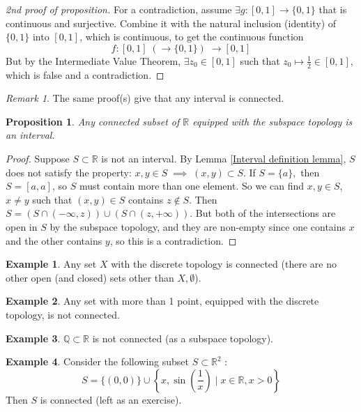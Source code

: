 \documentclass{article}
\theoremstyle{definition}
\newtheorem{exmp}{Example}[section]
\theoremstyle{plain}%
\newtheorem{prop}[thm]{Proposition}
\theoremstyle{remark}
\newtheorem*{rem}{Remark}
\newcommand{\union}{\cup}
\newcommand{\intersection}{\cap}
\newcommand{\R}{\mathbb{R}}
\newcommand{\Q}{\mathbb{Q}}
\begin{document}
\begin{proof}[2nd proof of proposition]
    For a contradiction, assume $\exists g: [0,1] \to \{0,1\}$ that is continuous and surjective. Combine it with the natural inclusion (identity) of $\{0,1\}$ into $[0,1]$, which is continuous, to get the continuous function \[f : [0,1] \; \left(\to \{0,1\}\right) \; \to [0,1]\] But by the Intermediate Value Theorem, $\exists z_0 \in [0,1]$ such that $z_0 \mapsto \frac{1}{2} \in [0,1]$, which is false and a contradiction.
\end{proof}

\begin{rem}
    The same proof(s) give that any interval is connected.
\end{rem}

\begin{prop}
    Any connected subset of $\R$ equipped with the subspace topology is an interval.
\end{prop}

\begin{proof}
    Suppose $S \subset \R$ is not an interval. By Lemma \ref{Interval definition lemma}, $S$ does not satisfy the property: $x,y \in S \; \implies \; (x,y) \subset S$. If $S = \{a\},$ then $S=[a,a]$, so $S$ must contain more than one element. So we can find $x,y \in S$, $x \ne y$ such that $(x,y) \in S$ contains $z \not\in S$. Then $S = \left(S \intersection (-\infty, z) \right) \union \left( S \intersection (z, +\infty) \right)$. But both of the intersections are open in $S$ by the subspace topology, and they are non-empty since one contains $x$ and the other contains $y$, so this is a contradiction.
\end{proof}

\begin{exmp}
    Any set $X$ with the discrete topology is connected (there are no other open (and closed) sets other than $X, \emptyset$).
\end{exmp}

\begin{exmp}
    Any set with more than 1 point, equipped with the discrete topology, is not connected.
\end{exmp}

\begin{exmp}
    $\Q \subset \R$ is not connected (as a subspace topology).
\end{exmp}

\begin{exmp}
    Consider the following subset $S \subset \R^2$ : \[S = \{(0,0)\} \union \left\{x, \sin \left(\frac{1}{x}\right) \; | \; x \in \R, x > 0\right\}\] Then $S$ is connected (left as an exercise).
\end{exmp}
\end{document}
